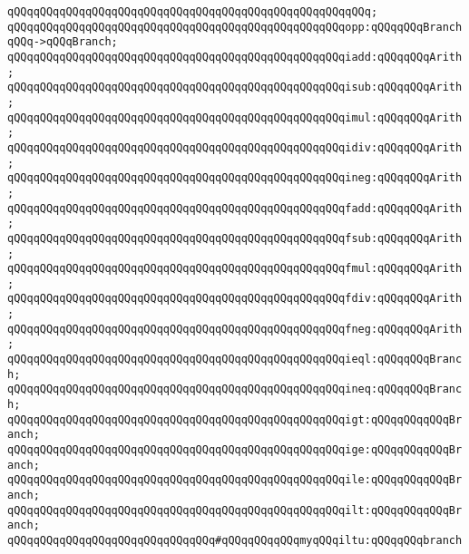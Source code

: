 \verb|qQQqqQQqqQQqqQQqqQQqqQQqqQQqqQQqqQQqqQQqqQQqqQQqqQQqqQQq;|\newline
\newline
\verb|qQQqqQQqqQQqqQQqqQQqqQQqqQQqqQQqqQQqqQQqqQQqqQQqqQQqopp:qQQqqQQqBranchqQQq->qQQqBranch;|\newline
\newline
\verb|qQQqqQQqqQQqqQQqqQQqqQQqqQQqqQQqqQQqqQQqqQQqqQQqqQQqiadd:qQQqqQQqArith;|\newline
\verb|qQQqqQQqqQQqqQQqqQQqqQQqqQQqqQQqqQQqqQQqqQQqqQQqqQQqisub:qQQqqQQqArith;|\newline
\verb|qQQqqQQqqQQqqQQqqQQqqQQqqQQqqQQqqQQqqQQqqQQqqQQqqQQqimul:qQQqqQQqArith;|\newline
\verb|qQQqqQQqqQQqqQQqqQQqqQQqqQQqqQQqqQQqqQQqqQQqqQQqqQQqidiv:qQQqqQQqArith;|\newline
\verb|qQQqqQQqqQQqqQQqqQQqqQQqqQQqqQQqqQQqqQQqqQQqqQQqqQQqineg:qQQqqQQqArith;|\newline
\newline
\verb|qQQqqQQqqQQqqQQqqQQqqQQqqQQqqQQqqQQqqQQqqQQqqQQqqQQqfadd:qQQqqQQqArith;|\newline
\verb|qQQqqQQqqQQqqQQqqQQqqQQqqQQqqQQqqQQqqQQqqQQqqQQqqQQqfsub:qQQqqQQqArith;|\newline
\verb|qQQqqQQqqQQqqQQqqQQqqQQqqQQqqQQqqQQqqQQqqQQqqQQqqQQqfmul:qQQqqQQqArith;|\newline
\verb|qQQqqQQqqQQqqQQqqQQqqQQqqQQqqQQqqQQqqQQqqQQqqQQqqQQqfdiv:qQQqqQQqArith;|\newline
\verb|qQQqqQQqqQQqqQQqqQQqqQQqqQQqqQQqqQQqqQQqqQQqqQQqqQQqfneg:qQQqqQQqArith;|\newline
\newline
\verb|qQQqqQQqqQQqqQQqqQQqqQQqqQQqqQQqqQQqqQQqqQQqqQQqqQQqieql:qQQqqQQqBranch;|\newline
\verb|qQQqqQQqqQQqqQQqqQQqqQQqqQQqqQQqqQQqqQQqqQQqqQQqqQQqineq:qQQqqQQqBranch;|\newline
\verb|qQQqqQQqqQQqqQQqqQQqqQQqqQQqqQQqqQQqqQQqqQQqqQQqqQQqigt:qQQqqQQqqQQqBranch;|\newline
\verb|qQQqqQQqqQQqqQQqqQQqqQQqqQQqqQQqqQQqqQQqqQQqqQQqqQQqige:qQQqqQQqqQQqBranch;|\newline
\verb|qQQqqQQqqQQqqQQqqQQqqQQqqQQqqQQqqQQqqQQqqQQqqQQqqQQqile:qQQqqQQqqQQqBranch;|\newline
\verb|qQQqqQQqqQQqqQQqqQQqqQQqqQQqqQQqqQQqqQQqqQQqqQQqqQQqilt:qQQqqQQqqQQqBranch;|\newline
\verb|qQQqqQQqqQQqqQQqqQQqqQQqqQQqqQQq#qQQqqQQqqQQqmyqQQqiltu:qQQqqQQqbranch|\newline
